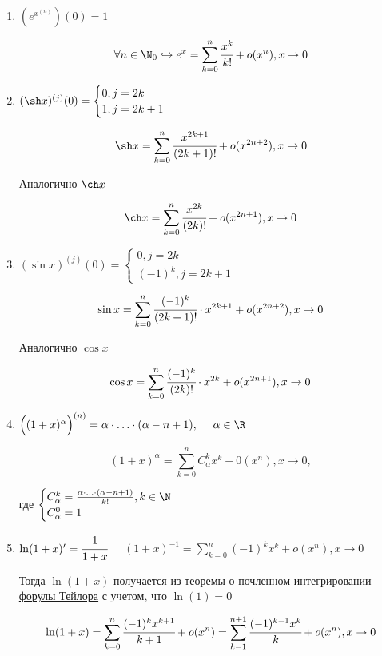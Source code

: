 \begin{enumerate}
	\item $(e^{x}^{(n)})(0) = 1$ 
	
	$$ \forall n \in \N_{0} \hookrightarrow e^{x} = \sum\limits_{k = 0}^{n} \cfrac{x^{k}}{k!} + o(x^{n}), x\to 0$$
	
	\item $(\sh x)^{(j)}(0) = \begin{cases}
		0, j = 2k \\
		1, j = 2k + 1
	\end{cases}$ 
	
	$$\sh x = \sum\limits_{k = 0}^{n} \cfrac{x^{2k+1}}{(2k+1)!} + o(x^{2n+2}), x\to 0$$
	
	Аналогично $\ch x$
	
	$$\ch x = \sum\limits_{k = 0}^{n} \cfrac{x^{2k}}{(2k)!} + o(x^{2n+1}), x\to 0$$
	
	\item $(\sin x)^{(j)}(0) = \begin{cases}
		0, j = 2k \\
		(-1)^{k}, j = 2k + 1
	\end{cases}$ 
	
	$$\sin x = \sum\limits_{k = 0}^{n} \cfrac{(-1)^{k}}{(2k+1)!} \cdot x^{2k+1} + o(x^{2n+2}), x\to 0$$
	
	Аналогично $\cos x$
	
	$$\cos x = \sum\limits_{k = 0}^{n} \cfrac{(-1)^{k}}{(2k)!} \cdot x^{2k} + o(x^{2n+1}), x\to 0$$
	
	\item $\Big((1 + x)^{\alpha}\Big)^{(n)} = \alpha\cdot\ldots\cdot (\alpha - n+1), \quad \ \alpha \in \R$
	
	$$(1 + x)^{\alpha} = \sum\limits_{k = 0}^{n} C_{\alpha}^{k}x^{k}  + 0(x^{n}), x\to 0,$$
	
	где $\begin{cases}
			C_{\alpha}^{k} = \frac{\alpha\cdot\ldots\cdot (\alpha - n+1)}{k!}, k \in \N \\
			C_{\alpha}^{0} = 1
		\end{cases}$
		
	\item $\ln(1+x)' = \cfrac{1}{1 + x}$ $\quad (1 + x)^{-1} = \sum\limits_{k = 0}^{n} (-1)^{k} x^{k} + o(x^{n}), x\to 0$ 
	
	Тогда $\ln(1 + x)$ получается из \hyperlink{thrm7.4}{теоремы о почленном интегрировании форулы Тейлора} с учетом, что $\ln(1) = 0$
	
	$$\ln(1 + x) = \sum\limits_{k =0}^{n} \cfrac{(-1)^{k} x^{k+1}}{k+1} + o(x^{n}) = \sum\limits_{k=1}^{n+1} \cfrac{(-1)^{k-1} x^{k}}{k} + o(x^{n}) , x\to 0$$
\end{enumerate}
